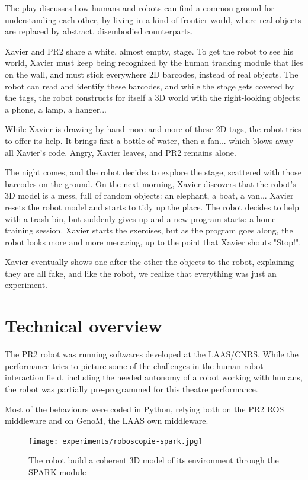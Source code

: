 The play discusses how humans and robots can find a common ground for understanding
each other, by living in a kind of frontier world, where real objects are replaced 
by abstract, disembodied counterparts.

Xavier and PR2 share a white, almost empty, stage. To get the robot to see his
world, Xavier must keep being recognized by the human tracking module that lies
on the wall, and must stick everywhere 2D barcodes, instead of real
objects. The robot can read and identify these barcodes, and while the stage
gets covered by the tags, the robot constructs for itself a 3D world with the
right-looking objects: a phone, a lamp, a hanger...

While Xavier is drawing by hand more and more of these 2D tags, the robot tries
to offer its help. It brings first a bottle of water, then a fan... which blows
away all Xavier's code. Angry, Xavier leaves, and PR2 remains alone.

The night comes, and the robot decides to explore the stage, scattered with
those barcodes on the ground. On the next morning, Xavier discovers that the
robot's 3D model is a mess, full of random objects: an elephant, a boat, a
van... Xavier resets the robot model and starts to tidy up the place. The robot
decides to help with a trash bin, but suddenly gives up and a new program
starts: a home-training session. Xavier starts the exercises, but as the
program goes along, the robot looks more and more menacing, up to the point
that Xavier shouts "Stop!".

Xavier eventually shows one after the other the objects to the robot,
explaining they are all fake, and like the robot, we realize that everything
was just an experiment.

\section{Technical overview}

The PR2 robot was running softwares developed at the LAAS/CNRS. While the
performance tries to picture some of the challenges in the human-robot
interaction field, including the needed autonomy of a robot working with
humans, the robot was partially pre-programmed for this theatre performance.

Most of the behaviours were coded in Python, relying both on the PR2 ROS
middleware and on {\sc GenoM}, the LAAS own middleware.

\begin{figure}
    \centering
    \texttt{[image: experiments/roboscopie-spark.jpg]}
    \caption{The robot build a coherent 3D model of its environment through the
    SPARK module}
    \label{fig|spark}
\end{figure}

